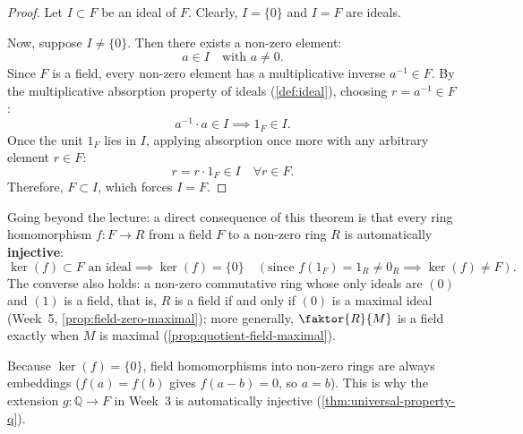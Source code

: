 \begin{content}

\begin{proof}
Let $I \subset F$ be an ideal of $F$. Clearly, $I = \{0\}$ and $I = F$ are ideals.

Now, suppose $I \neq \{0\}$. Then there exists a non-zero element:
\[
a \in I \quad \text{with } a \neq 0.
\]
Since $F$ is a field, every non-zero element has a multiplicative inverse $a^{-1} \in F$. By the multiplicative absorption property of ideals (\cref{def:ideal}), choosing $r = a^{-1} \in F$:
\[
a^{-1} \cdot a \in I \implies 1_F \in I.
\]
Once the unit $1_F$ lies in $I$, applying absorption once more with any arbitrary element $r \in F$:
\[
r = r \cdot 1_F \in I \quad \forall r \in F.
\]
Therefore, $F \subset I$, which forces $I = F$.
\end{proof}

\begin{steps}
Going beyond the lecture: a direct consequence of this theorem is that every ring homomorphism $f \colon F \to R$ from a field $F$ to a non-zero ring $R$ is automatically \textbf{injective}:
\[
\ker(f) \subset F \text{ an ideal} \implies \ker(f) = \{0\} \quad (\text{since } f(1_F) = 1_R \neq 0_R \implies \ker(f) \neq F).
\]
The converse also holds: a non-zero commutative ring whose only ideals are $(0)$ and $(1)$ is a field, that is, $R$ is a field if and only if $(0)$ is a maximal ideal (Week~5, \cref{prop:field-zero-maximal}); more generally, $\faktor{R}{M}$ is a field exactly when $M$ is maximal (\cref{prop:quotient-field-maximal}).

Because $\ker(f) = \{0\}$, field homomorphisms into non-zero rings are always embeddings ($f(a) = f(b)$ gives $f(a - b) = 0$, so $a = b$). This is why the extension $g \colon \mathbb{Q} \to F$ in Week~3 is automatically injective (\cref{thm:universal-property-q}).
\end{steps}
\end{content}

